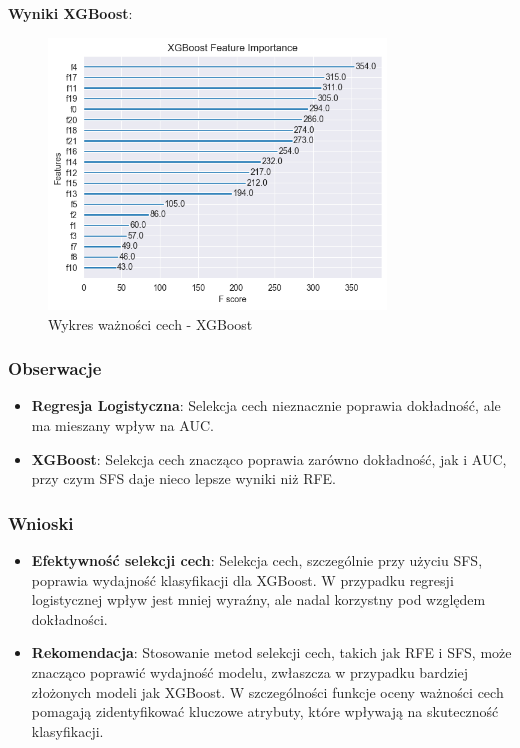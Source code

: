 \documentclass{article}
\begin{document}
\textbf{Wyniki XGBoost}:
\begin{figure}[H]
    \centering
    \includegraphics[width=0.8\textwidth]{./xgb_importance.png}
    \caption{Wykres ważności cech - XGBoost}
    \label{fig:xgb_feature_importance}
\end{figure}


\subsubsection{Obserwacje}
\begin{itemize}
    \item \textbf{Regresja Logistyczna}: Selekcja cech nieznacznie poprawia dokładność, ale ma mieszany wpływ na AUC.
    \item \textbf{XGBoost}: Selekcja cech znacząco poprawia zarówno dokładność, jak i AUC, przy czym SFS daje nieco lepsze wyniki niż RFE.
\end{itemize}

\subsubsection{Wnioski}
\begin{itemize}
    \item \textbf{Efektywność selekcji cech}: Selekcja cech, szczególnie przy użyciu SFS, poprawia wydajność klasyfikacji dla XGBoost. W przypadku regresji logistycznej wpływ jest mniej wyraźny, ale nadal korzystny pod względem dokładności.
    \item \textbf{Rekomendacja}: Stosowanie metod selekcji cech, takich jak RFE i SFS, może znacząco poprawić wydajność modelu, zwłaszcza w przypadku bardziej złożonych modeli jak XGBoost. W szczególności funkcje oceny ważności cech pomagają zidentyfikować kluczowe atrybuty, które wpływają na skuteczność klasyfikacji.
\end{itemize}
\end{document}
